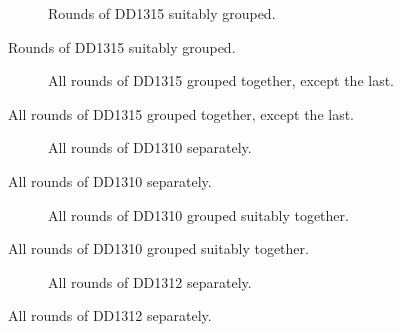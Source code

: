 \begin{figure}
\centering
%
\caption{Rounds of DD1315 suitably grouped.}
\label{DD1315-grouped-figure}
\end{figure}

\begin{table}
\centering
%
\caption{Rounds of DD1315 suitably grouped.}
\label{DD1315-grouped-table}
\end{table}

\begin{figure}
\centering
%
\caption{All rounds of DD1315 grouped together, except the last.}
\label{DD1315-last-figure}
\end{figure}

\begin{table}
\centering
%
\caption{All rounds of DD1315 grouped together, except the last.}
\label{DD1315-last-table}
\end{table}

\begin{figure}
\centering
%
\caption{All rounds of DD1310 separately.}
\label{DD1310-all-figure}
\end{figure}

\begin{table}
\centering
%
\caption{All rounds of DD1310 separately.}
\label{DD1310-all-table}
\end{table}

\begin{figure}
\centering
%
\caption{All rounds of DD1310 grouped suitably together.}
\label{DD1310-grouped-figure}
\end{figure}

\begin{table}
\centering
%
\caption{All rounds of DD1310 grouped suitably together.}
\label{DD1310-grouped-table}
\end{table}

\begin{figure}
\centering
%
\caption{All rounds of DD1312 separately.}
\label{DD1312-all-figure}
\end{figure}

\begin{table}
\centering
%
\caption{All rounds of DD1312 separately.}
\label{DD1312-all-table}
\end{table}

